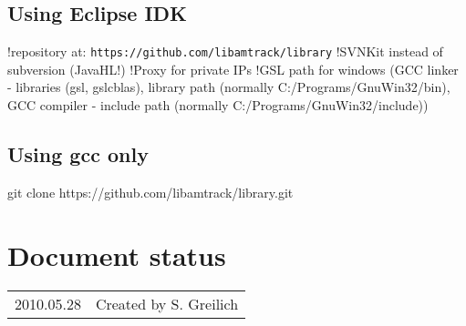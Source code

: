 \subsection{Using Eclipse IDK}
!repository at: \texttt{https://github.com/libamtrack/library}
!SVNKit instead of subversion (JavaHL!)
!Proxy for private IPs
!GSL path for windows (GCC linker - libraries (gsl, gslcblas), library path (normally C:/Programs/GnuWin32/bin), GCC compiler - include path (normally C:/Programs/GnuWin32/include))
\subsection{Using gcc only}
git clone https://github.com/libamtrack/library.git

\section*{Document status}
\begin{tabular}{l l}
2010.05.28&Created by S. Greilich
\end{tabular}